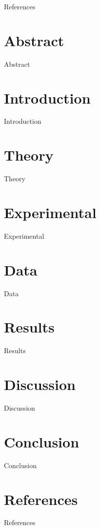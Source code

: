 \documentclass{article}
\begin{document}
References

\section*{Abstract}

Abstract

\section*{Introduction}

Introduction

\section*{Theory}

Theory

\section*{Experimental}

Experimental

\section*{Data}

Data

\section*{Results}

Results

\section*{Discussion}

Discussion

\section*{Conclusion}

Conclusion

\section*{References}

References

%
%
\end{document}
